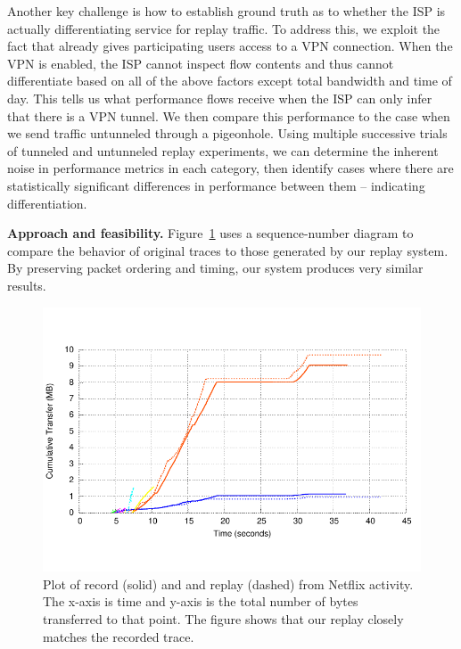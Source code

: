 Another key challenge is how to establish ground truth as to whether the ISP is 
actually differentiating service for replay traffic. To address this, we exploit the fact 
that \meddle already gives participating users access to a VPN connection. When the 
VPN is enabled, the ISP cannot inspect flow contents and thus cannot differentiate based 
on all of the above factors except total bandwidth and time of day. This tells us what 
performance flows receive when the ISP can only infer that there is a VPN tunnel. 
We then compare this performance to the case when we send traffic untunneled through a 
pigeonhole. Using multiple successive trials of tunneled and untunneled replay experiments, 
we can determine the inherent noise in performance metrics in each category, then 
identify cases where there are statistically significant differences in performance between 
them -- indicating differentiation. 





\noindent\textbf{Approach and feasibility.}
Figure~\ref{fig:replaySimilarity} uses a sequence-number diagram to compare the behavior of original traces 
to those generated by our replay system. By preserving packet ordering and timing, our 
system produces very similar results. 

\begin{figure}
\centering
\includegraphics[width=0.9\linewidth]{plots/netflix_seqnum_wifi_vs_cell.pdf}
\caption{Plot of record (solid) and and replay (dashed) from Netflix activity. The x-axis is time and y-axis is the 
total number of bytes transferred to that point. The figure shows that our replay closely matches 
the recorded trace.}
\vspace{\postfigspace}
\label{fig:replaySimilarity}
\end{figure}

